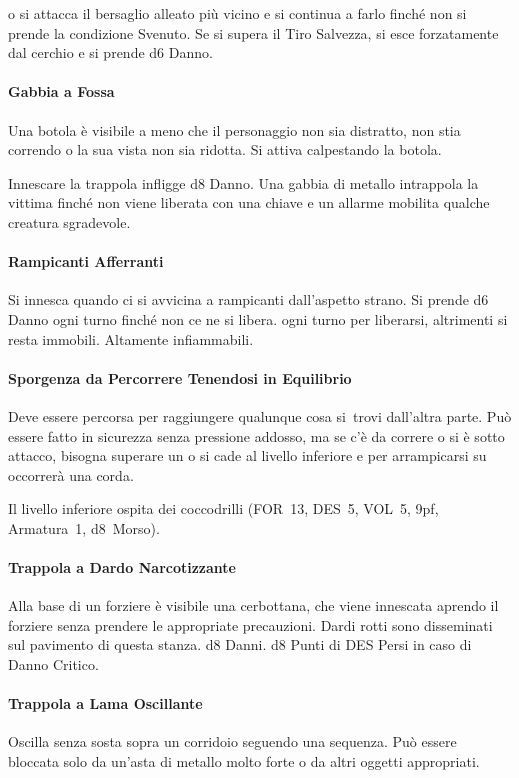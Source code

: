 \documentclass[itdr]{subfiles}
\begin{document}
 o si attacca il bersaglio alleato più vicino e si continua a farlo finché non si prende la condizione Svenuto. Se si supera il Tiro Salvezza, si esce forzatamente dal cerchio e si prende d6 Danno.

\vfill
\paragraph{Gabbia a Fossa}
Una botola è visibile a meno che il personaggio non sia distratto, non stia correndo o la sua vista non sia ridotta. Si attiva calpestando la botola.

Innescare la trappola infligge d8 Danno. Una gabbia di metallo intrappola la vittima finché non viene liberata con una chiave e un allarme mobilita qualche creatura sgradevole.

\vfill
\paragraph{Rampicanti Afferranti}
Si innesca quando ci si avvicina a rampicanti \mbox{dall'aspetto} strano. Si prende d6 Danno ogni \mbox{turno} finché non ce ne si libera.  ogni turno per liberarsi, altrimenti si resta immobili. Altamente infiammabili.

\vfill
\paragraph{Sporgenza da Percorrere Tenendosi in Equilibrio}
Deve essere percorsa per raggiungere qualunque cosa si~trovi dall'altra parte. Può essere fatto in sicurezza senza pressione addosso, ma se c'è da correre o si è sotto attacco, bisogna superare un  o si cade al livello inferiore e per arrampicarsi su occorrerà una corda.

Il livello inferiore ospita dei coccodrilli (FOR~13, DES~5, VOL~5, 9pf, Armatura~1, d8~Morso).

\vfill
\paragraph{Trappola a Dardo Narcotizzante}
Alla base di un forziere è visibile una cerbottana, che viene innescata aprendo il forziere senza prendere le appropriate precauzioni. Dardi rotti sono disseminati sul pavimento di questa stanza.
d8 Danni. d8 Punti di DES Persi in caso di Danno Critico.

\vfill
\paragraph{Trappola a Lama Oscillante}
Oscilla senza sosta sopra un corridoio seguendo una sequenza. Può essere bloccata solo da un'asta di metallo molto forte o da altri oggetti appropriati.
\end{document}
